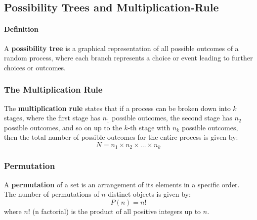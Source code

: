 \subsection*{Possibility Trees and Multiplication-Rule}
\hrulefill

\paragraph*{Definition}
A \textbf{possibility tree} is a graphical representation of all possible outcomes of a random process, where each branch represents a choice or event leading to further choices or outcomes.

\subsubsection*{The Multiplication Rule}
The \textbf{multiplication rule} states that if a process can be broken down into $k$ stages, where the first stage 
has $n_1$ possible outcomes, the second stage has $n_2$ possible outcomes, and so on up to the $k$-th stage with 
$n_k$ possible outcomes, then the total number of possible outcomes for the entire process is given by:
\begin{equation*}
    N = n_1 \times n_2 \times \ldots \times n_k
\end{equation*}

\subsubsection*{Permutation}
A \textbf{permutation} of a set is an arrangement of its elements in a specific order. The number of permutations of $n$ distinct objects is given by:
\begin{equation*}
    P(n) = n!
\end{equation*}
where $n!$ (n factorial) is the product of all positive integers up to $n$.

